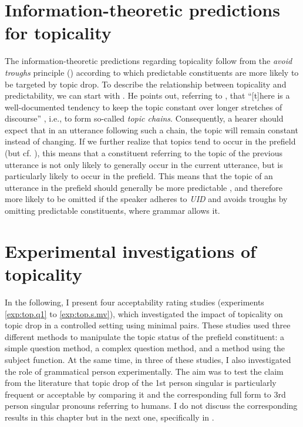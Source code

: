 \section{Information-theoretic predictions for topicality}\label{sec:info.theory.top}
The information-theoretic predictions regarding topicality follow from the \textit{avoid} \textit{troughs} principle () according to which predictable  constituents are more likely to be targeted by topic drop.
To describe the relationship between topicality and predictability,  we can start with \citet{krifka2007}.
He points out, referring to \citet{givon1983}, that ``[t]here is a well-documented tendency to keep the topic constant over longer stretches of discourse'' \citep[43]{krifka2007}, i.e., to form so-called \textit{topic chains}.
Consequently, a hearer should expect that in an utterance following such a chain, the topic will remain constant instead of changing.
If we further realize that topics tend to occur in the prefield (but cf. ), this means that a constituent referring to the topic of the previous utterance is not only likely to generally occur in the current utterance, but is particularly likely to occur in the prefield.
This means that the topic of an utterance in the prefield should generally be more predictable , and therefore more likely to be omitted if the speaker adheres to \textit{UID}  and avoids troughs by omitting predictable constituents, where grammar allows it.  

\section{Experimental investigations of topicality}\label{sec:topicality.experiments}
In the following, I present four acceptability rating studies (experiments \ref*{exp:top.q1} to \ref*{exp:top.s.mv}), which investigated the impact of topicality on topic drop in a controlled setting using minimal pairs.
These studies used three different methods to manipulate the topic status of the prefield constituent: a simple question method, a complex question method, and a method using the subject function.
At the same time, in three of these studies, I also investigated the role of grammatical person experimentally.
The aim was to test the claim from the literature that topic drop of the 1st person singular is particularly frequent or acceptable by comparing it and the corresponding full form to 3rd person singular pronouns referring to humans.
I do not discuss the corresponding results in this chapter but in the next one, specifically in .

